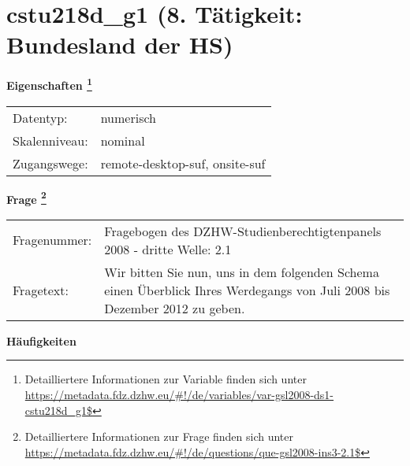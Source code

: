 
    \setcounter{footnote}{0}

    \vspace*{-1.8cm}
	\section{cstu218d\_g1 (8. Tätigkeit: Bundesland der HS)}
	\label{section:cstu218d_g1}



    \vspace*{0.5cm}
    \noindent\textbf{Eigenschaften
	\footnote{Detailliertere Informationen zur Variable finden sich unter
		\url{https://metadata.fdz.dzhw.eu/\#!/de/variables/var-gsl2008-ds1-cstu218d_g1$}}}\\
	\begin{tabularx}{\hsize}{@{}lX}
	Datentyp: & numerisch \\
	Skalenniveau: & nominal \\
	Zugangswege: &
	  remote-desktop-suf, 
	  onsite-suf
 \\
    \end{tabularx}



				\vspace*{0.5cm}
                \noindent\textbf{Frage
	                \footnote{Detailliertere Informationen zur Frage finden sich unter
		              \url{https://metadata.fdz.dzhw.eu/\#!/de/questions/que-gsl2008-ins3-2.1$}}}\\
				\begin{tabularx}{\hsize}{@{}lX}
					Fragenummer: &
					  Fragebogen des DZHW-Studienberechtigtenpanels 2008 - dritte Welle:
					  2.1
 \\
					Fragetext: & Wir bitten Sie nun, uns in dem folgenden Schema einen Überblick Ihres Werdegangs von Juli 2008 bis Dezember 2012 zu geben. \\
				\end{tabularx}





        		\vspace*{0.5cm}
                \noindent\textbf{Häufigkeiten}

